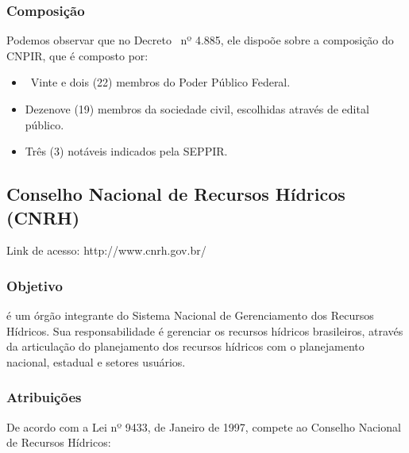 \subsubsection*{Composição}


Podemos observar que no Decreto \ nº 4.885, ele
dispoõe sobre a composição do CNPIR, que é composto por:

\begin{itemize}
\item 
\ Vinte e dois (22) membros do Poder Público Federal.
\item 
Dezenove (19) membros da sociedade civil, escolhidas através de edital
público.
\item 
Três (3) notáveis indicados pela SEPPIR.
\end{itemize}
\newpage
\subsection*{Conselho Nacional de Recursos Hídricos (CNRH)}

Link de acesso: http://www.cnrh.gov.br/


\subsubsection*{Objetivo}

é um órgão integrante do Sistema Nacional de Gerenciamento dos
Recursos Hídricos. Sua responsabilidade é gerenciar os recursos
hídricos brasileiros, através da articulação do planejamento
dos recursos hídricos com o planejamento nacional, estadual e setores
usuários.


\subsubsection*{Atribuições}

De acordo com a Lei nº 9433, de Janeiro de 1997, compete ao
Conselho Nacional de Recursos Hídricos:

